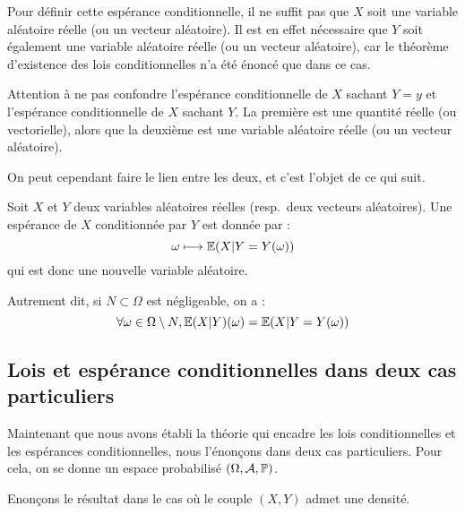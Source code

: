 \documentclass[../integ-proba.tex]{subfiles}
\begin{document}
    \begin{rem}
        Pour définir cette espérance conditionnelle, il ne suffit pas que $X$ soit une variable aléatoire réelle (ou un vecteur aléatoire).
        Il est en effet nécessaire que $Y$ soit également une variable aléatoire réelle (ou un vecteur aléatoire), car le théorème d'existence des lois conditionnelles n'a été énoncé que dans ce cas.
    \end{rem}

    \begin{rem}
        Attention à ne pas confondre l'espérance conditionnelle de $X$ sachant $Y = y$ et l'espérance conditionnelle de $X$ sachant $Y$.
        La première est une quantité réelle (ou vectorielle), alors que la deuxième est une variable aléatoire réelle (ou un vecteur aléatoire).

        On peut cependant faire le lien entre les deux, et c'est l'objet de ce qui suit.
    \end{rem}

    \begin{thm}
        Soit $X$ et $Y$ deux variables aléatoires réelles (resp.\ deux vecteurs aléatoires).
        Une espérance de $X$ conditionnée par $Y$ est donnée par :
        \begin{displaymath}
            \omega \longmapsto \mathbb{E}(X | Y = Y(\omega))
        \end{displaymath}
        qui est donc une nouvelle variable aléatoire.

        Autrement dit, si $N \subset \Omega$ est négligeable, on a :
        \begin{displaymath}
            \forall \omega \in \Omega \setminus N, \mathbb{E}(X | Y)(\omega) = \mathbb{E}(X | Y = Y(\omega))
        \end{displaymath}
    \end{thm}

    \subsection{Lois et espérance conditionnelles dans deux cas particuliers}

    Maintenant que nous avons établi la théorie qui encadre les lois conditionnelles et les espérances conditionnelles, nous l'énonçons dans deux cas particuliers.
    Pour cela, on se donne un espace probabilisé $\left( \Omega, \mathcal{A}, \mathbb{P} \right)$.

    Enonçons le résultat dans le cas où le couple $\left( X, Y \right)$ admet une densité.
\end{document}
